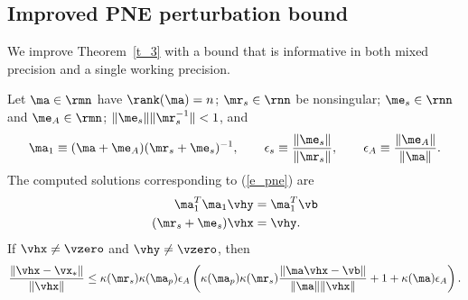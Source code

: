 \documentclass[final]{siamart220329}%
\begin{document}
\subsection{Improved PNE perturbation bound}\label{PNE_new}
 We improve Theorem~\ref{t_3} with a bound that is informative in both mixed precision and a single working precision.

\begin{theorem}\label{t_55}
Let $\ma\in\rmn$ have $\rank(\ma)=n$; $\mr_s\in\rnn$ be nonsingular; $\me_s\in\rnn$ and $\me_A\in\rmn$; $\|\me_s\|\|\mr_s^{-1}\|<1$, and
\begin{eqnarray*}
   \ma_1\equiv(\ma+\me_A)(\mr_s+\me_s)^{-1}, \qquad  \epsilon_s\equiv\frac{\|\me_s\|}{\|\mr_s\|},\qquad
   \epsilon_A\equiv\frac{\|\me_A\|}{\|\ma\|}.
\end{eqnarray*}
The computed solutions corresponding to (\ref{e_pne}) are 
\begin{eqnarray}
\ma_1^T\ma_1\vhy&=\ma_1^T\vb\label{e_pne2456}\\
(\mr_s+\me_s)\vhx&=\vhy.\label{e_pne2256}
\end{eqnarray}
If $\vhx\neq \vzero$ and $\vhy\neq\vzero$, then 
\begin{align*}
       \frac{\|\vhx-\vx_*\|}{\|\vhx\|} \leq \kappa(\mr_s)\kappa(\ma_p)\epsilon_A\left(\kappa(\ma_p)\kappa(\mr_s)\frac{\|\ma\vhx-\vb\|}{\|\ma\|\|\vhx\|}+1+\kappa(\ma)\epsilon_A\right).
    \end{align*}
\end{theorem}
\end{document}
